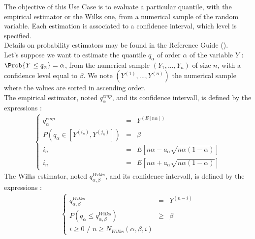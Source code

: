 \renewcommand{\filename}{docUC_CentralUncertainty_QuantileEstimation.tex}
\renewcommand{\filetitle}{UC : Quantile estimations : Wilks and empirical estimators}

\HeaderIIILevel




The objective of this Use Case is to evaluate a particular quantile, with the empirical estimator or the Wilks one, from a numerical sample of the random variable. Each estimation is associated to a confidence interval, which level is specified. \\


Details on probability estimators  may be found in the Reference Guide ().\\



Let's suppose we want to estimate the quantile $q_{\alpha}$ of order $\alpha$ of the variable $Y$ : $\Prob{Y \leq q_{\alpha}} = \alpha$, from the numerical sample $(Y_1, ..., Y_n)$ of size $n$, with a confidence level equal to $\beta$. We note $(Y^{(1)}, ..., Y^{(n)})$ the numerical sample where the values are sorted in ascending order.\\
The empirical estimator,  noted $q_{\alpha}^{emp}$, and its confidence intervall, is defined by the expressions :
\begin{align*}
  \left\{
  \begin{array}{lcl}
    q_{\alpha}^{emp} & = & Y^{(E[n\alpha])} \\
    P(q_{\alpha} \in [Y^{(i_n)}, Y^{(j_n)}]) & = & \beta \\
    i_n & = & E[n\alpha - a_{\alpha}\sqrt{n\alpha(1-\alpha)}] \\
    i_n & = & E[n\alpha + a_{\alpha}\sqrt{n\alpha(1-\alpha)}]
  \end{array}
  \right.
\end{align*}
The Wilks estimator,  noted $q_{\alpha, \beta}^{Wilks}$, and its confidence intervall, is defined by the expressions :
\begin{align*}
  \left\{
  \begin{array}{lcl}
    q_{\alpha, \beta}^{Wilks} & = & Y^{(n-i)} \\
    P(q_{\alpha}  \leq q_{\alpha, \beta}^{Wilks}) & \geq & \beta \\
    i\geq 0 \, \, /  \, \, n \geq N_{Wilks}(\alpha, \beta,i)
  \end{array}
  \right.
\end{align*}


